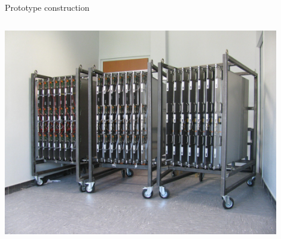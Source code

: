 \documentclass[10pt]{beamer}
\begin{document}
\begin{frame}[shrink=3]{Prototype construction}
\begin{block}
\begin{columns}
      \begin{column}{0.5\textwidth}
        \centerline{\includegraphics[width=0.9\textwidth]{jpg/ConstructionRack.jpg}}
      \end{column}
    \end{columns}
  \end{block}

\end{frame}
\end{document}
